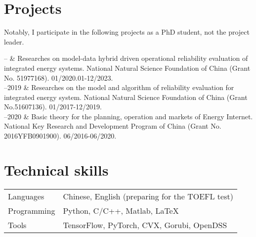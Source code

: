 \documentclass[11pt, a4paper]{article}
\newcommand{\TablePad}{\vspace{-0.4cm}}
\newcommand{\Duration}[2]{\fontsize{10pt}{0}\selectfont #1--#2}
\begin{document}
\section{Projects} 
Notably, I participate in the following projects as a PhD student, not the project leader.
\begin{EntriesTable}
	\Duration{2020}{}  &
	Researches on model-data hybrid driven operational reliability
	evaluation of integrated energy systems. National Natural Science Foundation of China (Grant No. 51977168). 01/2020.01-12/2023.
	\\
	\Duration{2017}{2019}  &
	Researches on the model and algorithm of reliability evaluation for integrated energy system. National Natural Science Foundation of China (Grant No.51607136). 01/2017-12/2019.
	\\
	\Duration{2016}{2020}  &
	Basic theory for the planning, operation and markets of Energy Internet. National Key Research and Development Program of China (Grant No. 2016YFB0901900). 06/2016-06/2020.
\end{EntriesTable}


\section{Technical skills}

\TablePad
\begin{tabularx}{\textwidth}{@{}p{} p{}@{}}
  Languages & Chinese, English (preparing for the TOEFL test)
  \\
  Programming & Python, C/C++, Matlab, LaTeX
  \\
  Tools & TensorFlow, PyTorch, CVX, Gorubi, OpenDSS
\end{tabularx}
\end{document}
